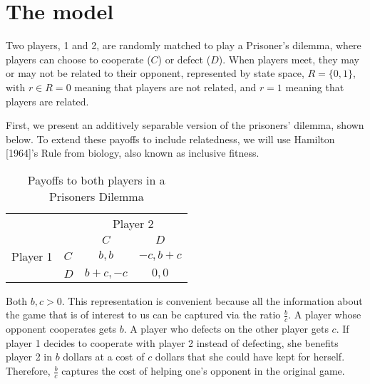\documentclass[12pt]{article}
\begin{document}
\section{The model} 

Two players, 1 and 2, are randomly matched to play a Prisoner's dilemma, where players can choose to cooperate ($C$) or defect ($D$). When players meet, they may or may not be related to their opponent, represented by state space, $R=\{0,1\}$, with $r\in R=0$ meaning that players are not related, and $r=1$ meaning that players are related. 

First, we present an additively separable version of the prisoners' dilemma, shown below. To extend these payoffs to include relatedness, we will use  Hamilton [1964]'s Rule from biology, also known as inclusive fitness.


\begin{table}[h]
\center
	\caption{Payoffs to both players in a Prisoners Dilemma} \vspace{1ex}
	\begin{tabular}{ll|c|c|}
	\multicolumn{2}{c}{}  & \multicolumn{2}{c}{\small Player 2} \\
	& \multicolumn{1}{c}{} & \multicolumn{1}{c}{$C$} & \multicolumn{1}{c}{$D$} \\
	\cline{3-4}
	\small Player 1 & $C$ & $b,b$ & $-c,b+c$ \\
	\cline{3-4} & $D$ & $b+c,-c$ & $0,0$\\\cline{3-4}
	\end{tabular}
\label{PD0}
\end{table}


Both $b,c>0$. This representation is convenient because all the information about the game that is of interest to us can be captured via the ratio $\frac{b}{c}$. A player whose opponent cooperates gets $b$. A player who defects on the other player gets $c$. If player 1 decides to cooperate with player 2 instead of defecting, she benefits player 2 in $b$ dollars at a cost of $c$ dollars that she could have kept for herself. Therefore, $\frac{b}{c}$ captures the cost of helping one's opponent in the original game.
\end{document}
